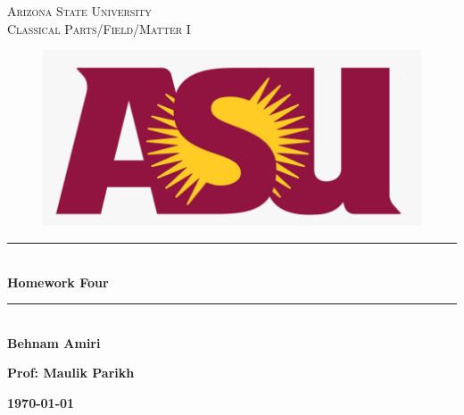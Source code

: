 \documentclass[fleqn]{article}
\begin{document}
  \begin{titlepage}

    \newcommand{\HRule}{\rule{\linewidth}{0.5mm}}

    \center


    \textsc{\LARGE Arizona State University}\\[1.5cm]

    \textsc{\LARGE Classical Parts/Field/Matter I}\\[1.5cm]


    \begin{figure}
      \includegraphics[width=\linewidth]{asu.png}
    \end{figure}


    \HRule \\[0.4cm]
    { \huge \bfseries Homework Four}\\[0.4cm] 
    \HRule \\[1.5cm]

    \textbf{Behnam Amiri}

    \bigbreak

    \textbf{Prof: Maulik Parikh}

    \bigbreak


    \textbf{{\large \today}\\[2cm]}

    \vfill

  \end{titlepage}
\end{document}
